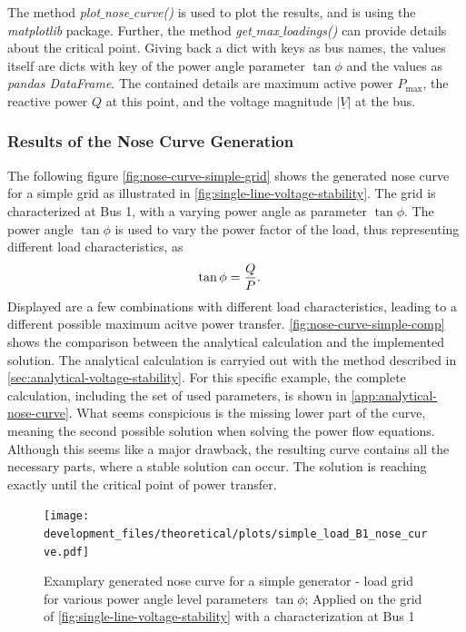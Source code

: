 The method {\itshape plot$\_$nose$\_$curve()} is used to plot the results, and is using the {\itshape matplotlib} package.
Further, the method {\itshape get$\_$max$\_$loadings()} can provide details about the critical point.
Giving back a dict with keys as bus names, the values itself are dicts with key of the power angle parameter $\tan \phi$ and the values as {\itshape pandas DataFrame}.
The contained details are maximum active power $P_\mathrm{max}$, the reactive power $Q$ at this point, and the voltage magnitude $\vert \underline{V} \vert$ at the bus.

\subsubsection{Results of the Nose Curve Generation}

The following figure \autoref{fig:nose-curve-simple-grid} shows the generated nose curve for a simple grid as illustrated in \autoref{fig:single-line-voltage-stability}.
The grid is characterized at Bus 1, with a varying power angle as parameter $\tan \phi$.
The power angle $\tan \phi$ is used to vary the power factor of the load, thus representing different load characteristics, as
\begin{align}
        \tan \phi &= \frac{Q}{P}. \notag %
\end{align}
Displayed are a few combinations with different load characteristics, leading to a different possible maximum acitve power transfer.
\autoref{fig:nose-curve-simple-comp} shows the comparison between the analytical calculation and the implemented solution.
The analytical calculation is carryied out with the method described in \autoref{sec:analytical-voltage-stability}.
For this specific example, the complete calculation, including the set of used parameters, is shown in \autoref{app:analytical-nose-curve}.
What seems conspicious is the missing lower part of the curve, meaning the second possible solution when solving the power flow equations.
Although this seems like a major drawback, the resulting curve contains all the necessary parts, where a stable solution can occur. \quelle
The solution is reaching exactly until the critical point of power transfer.

\begin{figure}[htbp!]
        \centering
        \texttt{[image: development\_files/theoretical/plots/simple\_load\_B1\_nose\_curve.pdf]}
        \caption[Examplary generated nose curve for a simple generator - load grid]{Examplary generated nose curve for a simple generator - load grid for various power angle level parameters $\tan \phi$; Applied on the grid of \autoref{fig:single-line-voltage-stability} with a characterization at Bus 1}
        \label{fig:nose-curve-simple-grid}
\end{figure}

